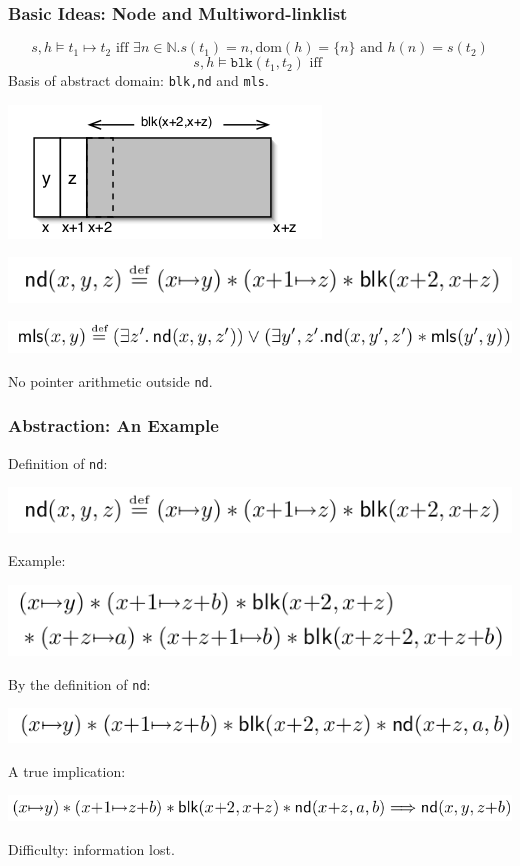 \documentclass[aspectratio=1610, 13pt]{beamer}
\begin{document}
\begin{frame}\frametitle{Basic Ideas: Node and Multiword-linklist}

\[s,h\models t_1\mapsto t_2\text{ iff } \exists n \in \mathbb{N}. s(t_1) = n,\text{dom}(h)=\{n\} \text{ and } h(n) = s(t_2)\]
\[s,h\models \mathtt{blk}(t_1,t_2) \text{ iff } \]
Basis of abstract domain: \texttt{blk,nd} and \texttt{mls}.
\begin{center}
\includegraphics[scale=0.4]{node_demo.png}

\includegraphics[scale=0.4]{node_def.png}

\includegraphics[scale=0.4]{mls_def.png}
\end{center}

No pointer arithmetic outside \texttt{nd}.
\end{frame}

\begin{frame}\frametitle{Abstraction: An Example}
Definition of \texttt{nd}:

\includegraphics[scale=0.4]{node_def.png}

Example:

\includegraphics[scale=0.4]{example_1.png}

By the definition of \texttt{nd}:

\includegraphics[scale=0.4]{example_2.png}

A true implication:

\includegraphics[scale=0.4]{example_3.png}

Difficulty: information lost.

\end{frame}
\end{document}
